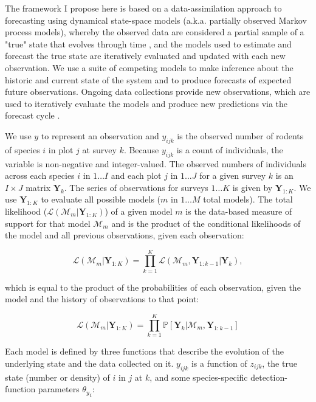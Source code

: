 \documentclass{article}
\begin{document}
The framework I propose here is based on a data-assimilation approach to forecasting using dynamical state-space models (a.k.a. partially observed Markov process models), whereby the observed data are considered a partial sample of a "true" state that evolves through time \citep{Ionides2006, King2016}, and the models used to estimate and forecast the true state are iteratively evaluated and updated with each new observation. We use a suite of competing models to make inference about the historic and current state of the system and to produce forecasts of expected future observations. Ongoing data collections provide new observations, which are used to iteratively evaluate the models and produce new predictions via the forecast cycle \citep{Dietze2017}. 

We use $y$ to represent an observation and $y_{ijk}$ is the observed number of rodents of species $i$ in plot $j$ at survey $k$. Because $y_{ijk}$ is a count of individuals, the variable is non-negative and integer-valued. The observed numbers of individuals across each species $i$ in $1 \ldots I$ and each plot $j$ in $1 \ldots J$ for a given survey $k$ is an $I \times J$ matrix $\textbf{Y}_k$. The series of observations for surveys $1 \ldots K$ is given by $\textbf{Y}_{1:K}$. We use $\textbf{Y}_{1:K}$ to evaluate all possible models ($m$ in $1 \ldots M$ total models). The total likelihood ($\mathcal{L}(\mathcal{M}_m|\textbf{Y}_{1:K})$) of a given model $m$ is the data-based measure of support for that model $\mathcal{M}_m$ and is the product of the conditional likelihoods of the model and all previous observations, given each observation:

\begin{equation}
\mathcal{L}(\mathcal{M}_m|\textbf{Y}_{1:K}) = \prod_{k = 1}^{K}{\mathcal{L}(\mathcal{M}_m, \textbf{Y}_{1:k-1}|\textbf{Y}_{k})},
\end{equation}

which is equal to the product of the probabilities of each observation, given the model and the history of observations to that point:

\begin{equation}
\mathcal{L}(\mathcal{M}_m|\textbf{Y}_{1:K}) = \prod_{k = 1}^{K}{\mathbb{P}[\textbf{Y}_{k}|\mathcal{M}_m, \textbf{Y}_{1:k-1}]}
\end{equation}

Each model is defined by three functions that describe the evolution of the underlying state and the data collected on it. $y_{ijk}$ is a function of $z_{ijk}$, the true state (number or density) of $i$ in $j$ at $k$, and some species-specific detection-function parameters ${\theta_{y}}_i$:
\end{document}
